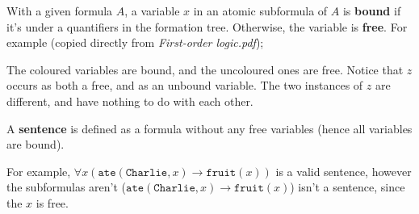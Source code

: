 \documentclass[a4paper, 12pt]{article}
\begin{document}
        With a given formula $A$, a variable $x$ in an atomic subformula of $A$ is \textbf{bound} if it's under a quantifiers in the formation tree. Otherwise, the variable is \textbf{free}. For example (copied directly from \textit{First-order logic.pdf});
        \begin{center}
        \end{center}
        The coloured variables are bound, and the uncoloured ones are free. Notice that $z$ occurs as both a free, and as an unbound variable. The two instances of $z$ are different, and have nothing to do with each other.
        \medskip

        A \textbf{sentence} is defined as a formula without any free variables (hence all variables are bound).
        \medskip

        For example, $\forall x (\texttt{ate}(\texttt{Charlie}, x) \rightarrow \texttt{fruit}(x))$ is a valid sentence, however the subformulas aren't ($\texttt{ate}(\texttt{Charlie}, x) \rightarrow \texttt{fruit}(x)$) isn't a sentence, since the $x$ is free.
        \medskip
\end{document}
